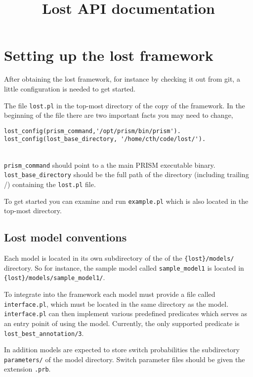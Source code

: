\documentclass{article}
\title{Lost API documentation}
\begin{document}
\maketitle

\section{Setting up the lost framework}

After obtaining the lost framework, for instance by checking it out
from git, a little configuration is needed to get started.

The file \texttt{lost.pl} in the top-most directory of the copy
of the framework. In the beginning of the file there are two 
important facts you may need to change,
\begin{verbatim}
lost_config(prism_command,'/opt/prism/bin/prism').
lost_config(lost_base_directory, '/home/cth/code/lost/').
\end{verbatim}
\\
\texttt{prism\_command} should point to a the main PRISM executable
binary. \\
\texttt{lost\_base\_directory} should be the full path of the
directory (including trailing /) containing the \texttt{lost.pl}
file. 

To get started you can examine and run \texttt{example.pl} which 
is also located in the top-most directory.

\subsection{Lost model conventions}
\label{sec:lost_model_conventions}

Each model is located in its own subdirectory of the of the
\texttt{\{lost\}/models/} directory. So for instance, the sample model
called \texttt{sample\_model1} is located in
\texttt{\{lost\}/models/sample\_model1/}.

To integrate into the framework each model must provide a file called
\texttt{interface.pl}, which must be located in the same directory as
the model. \texttt{interface.pl} can then implement various predefined
predicates which serves as an entry poinit of using the
model. Currently, the only supported predicate is
\texttt{lost\_best\_annotation/3}.

In addition models are expected to store switch probabilities the
subdirectory \texttt{parameters/} of the model directory. Switch
parameter files should be given the extension \texttt{.prb}.
\end{document}
